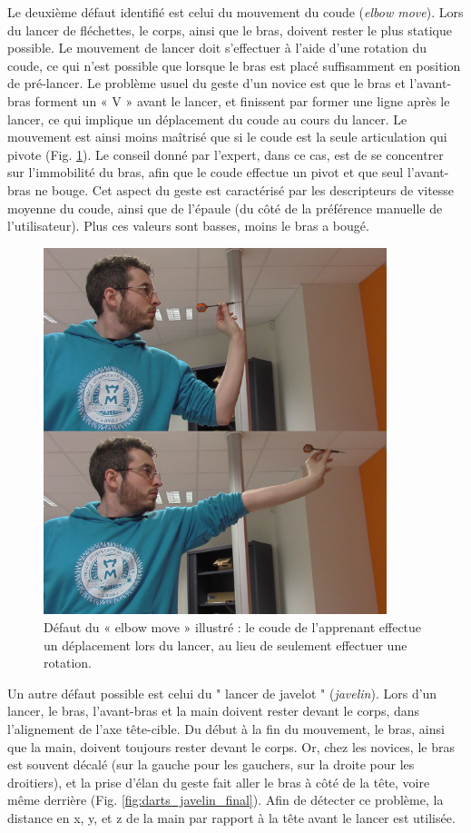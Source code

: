 Le deuxième défaut identifié est celui du mouvement du coude (\textit{elbow move}). Lors du lancer de fléchettes, le corps, ainsi que le bras, doivent rester le plus statique possible. Le mouvement de lancer doit s'effectuer à l'aide d'une rotation du coude, ce qui n'est possible que lorsque le bras est placé suffisamment en position de pré-lancer. Le problème usuel du geste d'un novice est que le bras et l'avant-bras forment un « V » avant le lancer, et finissent par former une ligne après le lancer, ce qui implique un déplacement du coude au cours du lancer. Le mouvement est ainsi moins maîtrisé que si le coude est la seule articulation qui pivote (Fig. \ref{fig:darts_elbow_move_final}). Le conseil donné par l'expert, dans ce cas, est de se concentrer sur l'immobilité du bras, afin que le coude effectue un pivot et que seul l'avant-bras ne bouge. Cet aspect du geste est caractérisé par les descripteurs de vitesse moyenne du coude, ainsi que de l'épaule (du côté de la préférence manuelle de l'utilisateur). Plus ces valeurs sont basses, moins le bras a bougé.

\begin{figure}
    \centering
    \includegraphics[width=10cm]{pictures/darts_elbow_move_final.png}
    \caption[Défaut du « elbow move » (déplacement du coude)]{Défaut du « elbow move » illustré : le coude de l'apprenant effectue un déplacement lors du lancer, au lieu de seulement effectuer une rotation.}
    \label{fig:darts_elbow_move_final}
\end{figure}

Un autre défaut possible est celui du " lancer de javelot " (\textit{javelin}). Lors d'un lancer, le bras, l'avant-bras et la main doivent rester devant le corps, dans l'alignement de l'axe tête-cible. Du début à la fin du mouvement, le bras, ainsi que la main, doivent toujours rester devant le corps. Or, chez les novices, le bras est souvent décalé (sur la gauche pour les gauchers, sur la droite pour les droitiers), et la prise d'élan du geste fait aller le bras à côté de la tête, voire même derrière (Fig. \ref{fig:darts_javelin_final}). Afin de détecter ce problème, la distance en x, y, et z de la main par rapport à la tête avant le lancer est utilisée.

